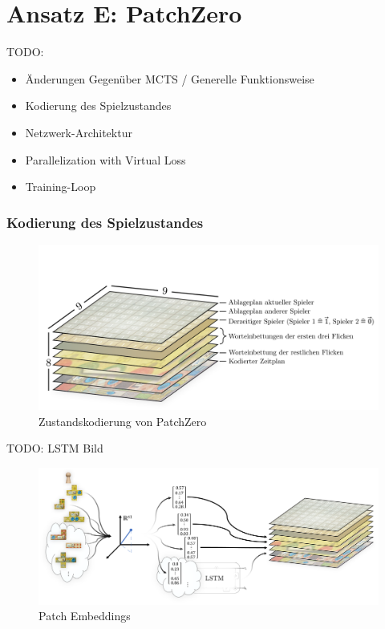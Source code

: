 \pagebreak

\section{Ansatz E: PatchZero}
\label{section:erstellung-ansatz-d}

TODO:

\begin{itemize}
    \item Änderungen Gegenüber MCTS / Generelle Funktionsweise
    \item Kodierung des Spielzustandes
    \item Netzwerk-Architektur
    \item Parallelization with Virtual Loss
    \item Training-Loop
\end{itemize}

\subsubsection*{Kodierung des Spielzustandes}

\begin{figure}[!ht]
    \centering
    \vspace*{-1.75cm}
    \includegraphics[width=\textwidth]{res/pictures/patch-zero-state.pdf}
    \caption{Zustandskodierung von PatchZero}
    \label{fig:patch-zero-state}
\end{figure}

TODO: LSTM Bild

\begin{figure}[!ht]
    \centering
    \includegraphics[width=\textwidth]{res/pictures/patch-embeddings.png}
    \caption{Patch Embeddings}
    \label{fig:patch-embeddings}
\end{figure}

